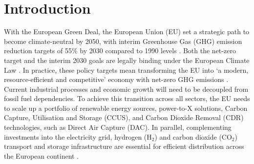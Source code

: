 \documentclass[pdflatex,sn-nature]{sn-jnl}
\theoremstyle{thmstyleone}%
\theoremstyle{thmstyletwo}%
\theoremstyle{thmstylethree}%
\begin{document}
\maketitle

\clearpage
\section{Introduction}\label{sec:introduction}
With the European Green Deal, the European Union (EU) set a strategic path to become climate-neutral by 2050, with interim Greenhouse Gas (GHG) emission reduction targets of 55\% by 2030 compared to 1990 levels \cite{europeancommissionFit55Delivering2021}. Both the net-zero target and the interim 2030 goals are legally binding under the European Climate Law \cite{europeanparliamentRegulationEU20212021}. In practice, these policy targets mean transforming the EU into `a modern, resource-efficient and competitive' economy with net-zero GHG emissions \cite{europeancommissionEuropeanGreenDeal2021}. Current industrial processes and economic growth will need to be decoupled from fossil fuel dependencies. To achieve this transition across all sectors, the EU needs to scale up a portfolio of renewable energy sources, power-to-X solutions, Carbon Capture, Utilisation and Storage (CCUS), and Carbon Dioxide Removal (CDR) technologies, such as Direct Air Capture (DAC). In parallel, complementing investments into the electricity grid, hydrogen (H$_2$) and carbon dioxide (CO$_2$) transport and storage infrastructure are essential for efficient distribution across the European continent \cite{hofmannH2CO2Network2025}.
\end{document}
